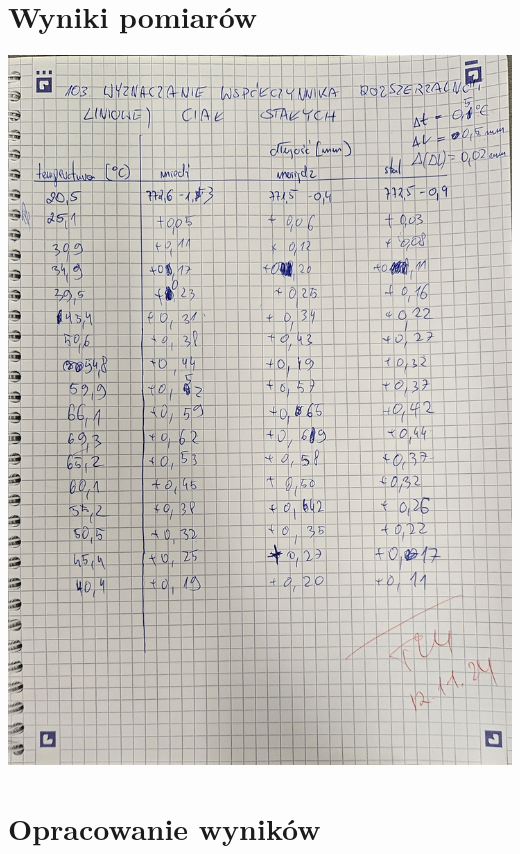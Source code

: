\documentclass[a4paper, 11pt]{article}
\begin{document}

\section{Wyniki pomiarów}\label{sec:wyniki_pomiarow} %

\begin{center}
	\includegraphics[scale=0.22]{images/pomiary.jpg}
\end{center}

\pagebreak
\section{Opracowanie wyników}\label{sec:opracowanie_wynikow} %
\end{document}
